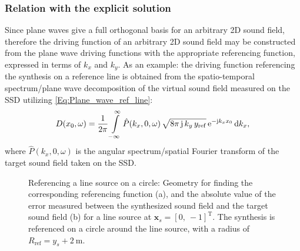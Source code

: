 \subsubsection{Relation with the explicit solution}
Since plane waves give a full orthogonal basis for an arbitrary 2D sound field, therefore the driving function of an arbitrary 2D sound field may be constructed from the plane wave driving functions with the appropriate referencing function, expressed in terms of $k_x$ and $k_y$.
 As an example: the driving function referencing the synthesis on a reference line is obtained from the spatio-temporal spectrum/plane wave decomposition of the virtual sound field measured on the SSD utilizing \eqref{Eq:Plane_wave_ref_line}: %
\begin{equation}
D(x_0,\omega) = \frac{1}{2\pi} \int\limits_{-\infty}^{\infty} \hat{P}(k_x,0,\omega) \,\sqrt{8\pi\,\mathrm{j}\,k_y\,y_{\mathrm{ref}}} 
\,\mathrm{e}^{-\mathrm{j} k_x x_0}\,
 \mathrm{d} k_x,
	\label{Eq:General_WFS_in_kx_domain}
\end{equation}
where $\hat{P}(k_x,0,\omega)$ is the angular spectrum/spatial Fourier transform of the target sound field taken on the SSD.

\begin{figure} 
	\centering
	\hspace{10mm}
\caption{Referencing a line source on a circle: Geometry for finding the corresponding referencing function (a), and the absolute value of the error measured between the synthesized sound field and the target sound field (b) for a line source at $\mathbf{x}_s = [0,\ -1]^{\mathrm{T}}$.
The synthesis is referenced on a circle around the line source, with a radius of $R_{\mathrm{ref}} = y_s + 2 ~\mathrm{m}$.
}
	\label{Fig:Theory:circle_referencing}
\end{figure}

